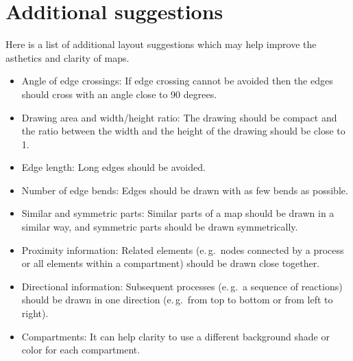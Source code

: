 \section{Additional suggestions}

Here is a list of additional layout suggestions which may help improve the asthetics and clarity of \PD maps.

\begin{itemize}
  \item Angle of edge crossings: If edge crossing cannot be avoided then the edges should cross with an angle close to 90 degrees.
 \item Drawing area and width/height ratio: The drawing should
  be compact and the ratio between the width and the height
  of the drawing should be close to 1.
  \item Edge length: Long edges should be avoided.
  \item Number of edge bends: Edges should be drawn with
  as few bends as possible.
  \item Similar and symmetric parts: Similar parts of a map
  should be drawn in a similar way, and symmetric parts
  should be drawn symmetrically.
  \item Proximity information: Related elements (e.\,g.~nodes
  connected by a process or all elements within a compartment)
  should be drawn close together.
  \item Directional information: Subsequent processes (e.\,g.~a sequence
  of reactions) should be drawn in one direction (e.\,g.~from
  top to bottom or from left to right).
  \item Compartments: It can help clarity to use a different background shade or color for each compartment.
\end{itemize}
